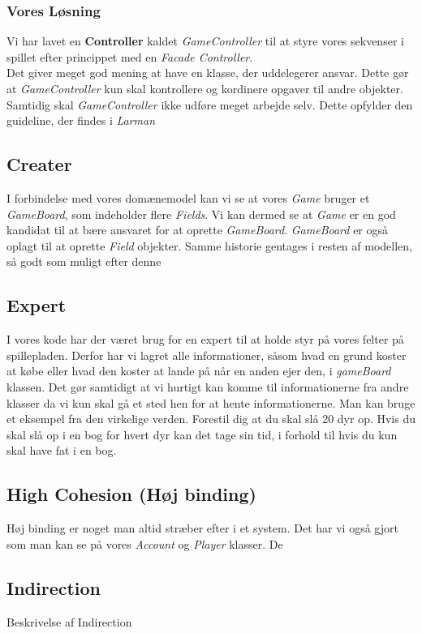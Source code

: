 \subsubsection*{Vores Løsning}
Vi har lavet en \textbf{Controller} kaldet \textit{GameController} til at styre vores sekvenser i spillet efter princippet med en \textit{Facade Controller}. 
\\
Det giver meget god mening at have en klasse, der uddelegerer ansvar. Dette gør at \textit{GameController} kun skal kontrollere og kordinere opgaver til andre objekter. Samtidig skal \textit{GameController} ikke udføre meget arbejde selv. Dette opfylder den guideline, der findes i \textit{Larman}
\subsection{Creater}
I forbindelse med vores domænemodel kan vi se at vores \textit{Game} bruger et \textit{GameBoard}, som indeholder flere \textit{Fields}. Vi kan dermed se at \textit{Game} er en god kandidat til at bære ansvaret for at oprette \textit{GameBoard}. \textit{GameBoard} er også oplagt til at oprette \textit{Field} objekter. Samme historie gentages i resten af modellen, så godt som muligt efter denne
\subsection{Expert}
I vores kode har der været brug for en expert til at holde styr på vores felter på spillepladen. Derfor har vi lagret alle informationer, såsom hvad en grund koster at købe eller hvad den koster at lande på når en anden ejer den, i \textit{gameBoard} klassen. Det gør samtidigt at vi hurtigt kan komme til informationerne fra andre klasser da vi kun skal gå et sted hen for at hente informationerne. 
Man kan bruge et eksempel fra den virkelige verden. Forestil dig at du skal slå 20 dyr op. Hvis du skal slå op i en bog for hvert dyr kan det tage sin tid, i forhold til hvis du kun skal have fat i en bog.
\\
\subsection{High Cohesion (Høj binding)}
Høj binding er noget man altid stræber efter i et system. Det har vi også gjort som man kan se på vores \textit{Account} og \textit{Player} klasser. De
\subsection{Indirection}
Beskrivelse af Indirection
